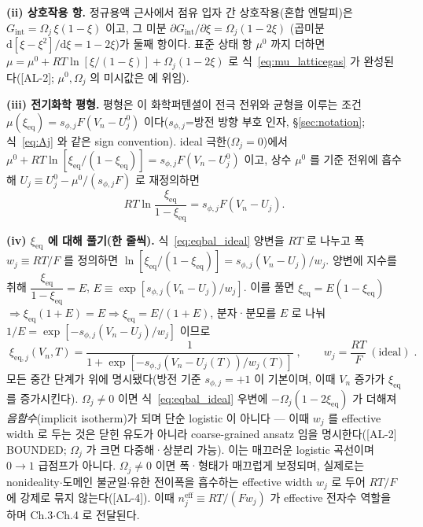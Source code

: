 \documentclass[11pt,a4paper]{article}
\newcommand{\dd}{\mathrm{d}}
\newcommand{\eff}{\mathrm{eff}}
\newcommand{\eq}{\mathrm{eq}}
\newcommand{\AL}[1]{\textsf{[AL-#1]}}
\begin{document}
\textbf{(ii) 상호작용 항.} 정규용액 근사에서 점유 입자 간 상호작용(혼합 엔탈피)은
$G_{\mathrm{int}}=\Omega_j\,\xi(1-\xi)$ 이고, 그 미분 $\partial G_{\mathrm{int}}/\partial\xi
=\Omega_j(1-2\xi)$ (곱미분 $\dd[\xi-\xi^2]/\dd\xi=1-2\xi$)가 둘째 항이다. 표준 상태 항 $\mu^0$ 까지 더하면
$\mu=\mu^0+RT\ln[\xi/(1-\xi)]+\Omega_j(1-2\xi)$ 로 식~\eqref{eq:mu_latticegas} 가 완성된다(\AL{2};
$\mu^0,\Omega_j$ 의 미시값은 \cite{mckinnon1983,bazant2013} 에 위임).

\textbf{(iii) 전기화학 평형.} 평형은 이 화학퍼텐셜이 전극 전위와 균형을 이루는 조건
$\mu(\xi_\eq)=s_{\phi,j}F(V_n-U_j^0)$ 이다($s_{\phi,j}$=방전 방향 부호 인자, \S\ref{sec:notation};
식~\eqref{eq:Aj} 와 같은 sign convention). ideal 극한($\Omega_j=0$)에서 $\mu^0+RT\ln[\xi_\eq/(1-\xi_\eq)]
=s_{\phi,j}F(V_n-U_j^0)$ 이고, 상수 $\mu^0$ 를 기준 전위에 흡수해 $U_j\equiv U_j^0-\mu^0/(s_{\phi,j}F)$ 로
재정의하면
\begin{equation}
RT\ln\frac{\xi_\eq}{1-\xi_\eq}=s_{\phi,j}F(V_n-U_j).
\label{eq:eqbal_ideal}
\end{equation}

\textbf{(iv) $\xi_\eq$ 에 대해 풀기(한 줄씩).} 식~\eqref{eq:eqbal_ideal} 양변을 $RT$ 로 나누고 폭
$w_j\equiv RT/F$ 를 정의하면 $\ln[\xi_\eq/(1-\xi_\eq)]=s_{\phi,j}(V_n-U_j)/w_j$. 양변에 지수를 취해
$\dfrac{\xi_\eq}{1-\xi_\eq}=E$, $E\equiv\exp[s_{\phi,j}(V_n-U_j)/w_j]$. 이를 풀면 $\xi_\eq=E(1-\xi_\eq)$
$\Rightarrow\xi_\eq(1+E)=E\Rightarrow\xi_\eq=E/(1+E)$, 분자·분모를 $E$ 로 나눠 $1/E=\exp[-s_{\phi,j}(V_n-U_j)/w_j]$
이므로
\begin{equation}
\boxed{\;\xi_{\eq,j}(V_n,T)=\frac{1}{1+\exp[-s_{\phi,j}(V_n-U_j(T))/w_j(T)]}\;,\qquad w_j=\frac{RT}{F}\ (\text{ideal})\;.}
\label{eq:logistic}
\end{equation}
모든 중간 단계가 위에 명시됐다(방전 기준 $s_{\phi,j}=+1$ 이 기본이며, 이때 $V_n$ 증가가 $\xi_\eq$ 를 증가시킨다).
$\Omega_j\ne0$ 이면 식~\eqref{eq:eqbal_ideal} 우변에 $-\Omega_j(1-2\xi_\eq)$ 가 더해져 \emph{음함수}(implicit
isotherm)가 되며 단순 logistic 이 아니다 — 이때 $w_j$ 를 effective width 로 두는 것은 닫힌 유도가 아니라
coarse-grained ansatz 임을 명시한다(\AL{2} BOUNDED; $\Omega_j$ 가 크면 다중해·상분리 가능). 이는 매끄러운 logistic 곡선이며 $0\!\to\!1$ 급점프가
아니다. $\Omega_j\ne0$ 이면 폭·형태가 매끄럽게 보정되며, 실제로는 nonideality$\cdot$도메인 불균일$\cdot$유한
전이폭을 흡수하는 effective width $w_j$ 로 두어 $RT/F$ 에 강제로 묶지 않는다(\AL{4}). 이때
$n_j^{\eff}\equiv RT/(Fw_j)$ 가 effective 전자수 역할을 하며 Ch.3$\cdot$Ch.4 로 전달된다.
\end{document}
